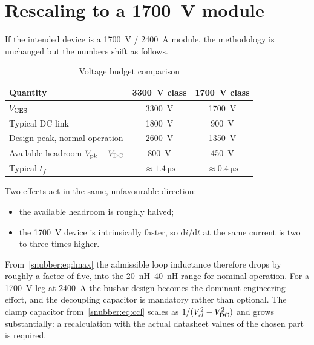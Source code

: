 \section{Rescaling to a \SI{1700}{\volt} module}
\label{snubber:sec:rescale}

If the intended device is a \SI{1700}{\volt} / \SI{2400}{\ampere} module, the
methodology is unchanged but the numbers shift as follows.

\begin{table}[htbp]
\centering
\caption{Voltage budget comparison}
\label{snubber:tab:rescale}
\begin{tabular}{lcc}
\toprule
Quantity & \SI{3300}{\volt} class & \SI{1700}{\volt} class \\
\midrule
$V_{\mathrm{CES}}$                             & \SI{3300}{\volt} & \SI{1700}{\volt} \\
Typical DC link                     & \SI{1800}{\volt} & \SI{900}{\volt} \\
Design peak, normal operation       & \SI{2600}{\volt} & \SI{1350}{\volt} \\
Available headroom $V_{\mathrm{pk}} - V_{\mathrm{DC}}$   & \SI{800}{\volt}  & \SI{450}{\volt} \\
Typical $t_f$                       & $\approx\SI{1.4}{\micro\second}$ & $\approx\SI{0.4}{\micro\second}$ \\
\bottomrule
\end{tabular}
\end{table}

Two effects act in the same, unfavourable direction:
\begin{itemize}[nosep]
\item the available headroom is roughly halved;
\item the \SI{1700}{\volt} device is intrinsically faster, so
      $\mathrm{d}i/\mathrm{d}t$ at the same current is two to three times
      higher.
\end{itemize}
From~\eqref{snubber:eq:lmax} the admissible loop inductance therefore drops by roughly
a factor of five, into the \SIrange{20}{40}{\nano\henry} range for nominal
operation. For a \SI{1700}{\volt} leg at \SI{2400}{\ampere} the busbar design
becomes the dominant engineering effort, and the decoupling capacitor is
mandatory rather than optional. The clamp capacitor
from~\eqref{snubber:eq:ccl} scales as $1/(V_{cl}^{2}-V_{\mathrm{DC}}^{2})$ and grows
substantially: a recalculation with the actual datasheet values of the chosen
part is required.


